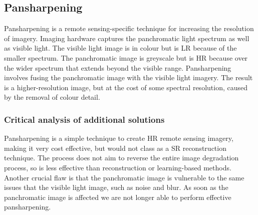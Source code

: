 \subsection{Pansharpening}
Pansharpening is a remote sensing-specific technique for increasing the resolution of imagery. Imaging hardware captures the panchromatic light spectrum as well as visible light. The visible light image is in colour but is LR because of the smaller spectrum. The panchromatic image is greyscale but is HR because over the wider spectrum that extends beyond the visible range. Pansharpening involves fusing the panchromatic image with the visible light imagery. The result is a higher-resolution image, but at the cost of some spectral resolution, caused by the removal of colour detail.

\subsubsection{Critical analysis of additional solutions}
Pansharpening is a simple technique to create HR remote sensing imagery, making it very cost effective, but would not class as a SR reconstruction technique. The process does not aim to reverse the entire image degradation process, so is less effective than reconstruction or learning-based methods. Another crucial flaw is that the panchromatic image is vulnerable to the same issues that the visible light image, such as noise and blur. As soon as the panchromatic image is affected we are not longer able to perform effective pansharpening.

